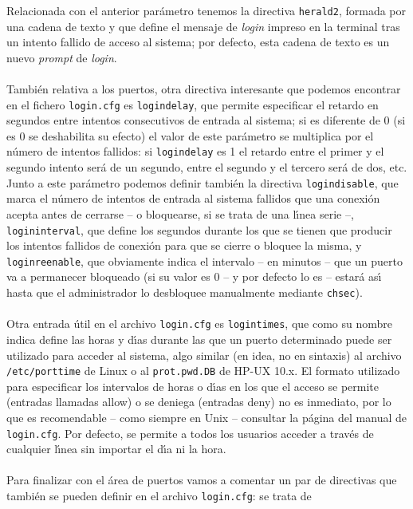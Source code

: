 Relacionada con el anterior par\'ametro tenemos la directiva {\tt herald2}, 
formada por una cadena de texto y que define el mensaje de {\it login} impreso
en la terminal tras un intento fallido de acceso al sistema; por defecto, esta
cadena de texto es un nuevo {\it prompt} de {\it login}.\\
\\Tambi\'en relativa a los puertos, otra directiva interesante que podemos 
encontrar en el fichero {\tt login.cfg}
es {\tt logindelay}, que permite especificar el retardo en segundos entre
intentos consecutivos de entrada al sistema; si es diferente de 0 (si es 0 se
deshabilita su efecto) el valor de este par\'ametro se multiplica por el 
n\'umero de intentos fallidos: si {\tt logindelay} es 1 el retardo entre el 
primer y el segundo intento ser\'a de un segundo, entre el segundo y el tercero
ser\'a de dos, etc. Junto a este par\'ametro podemos definir tambi\'en la
directiva {\tt logindisable}, que marca el n\'umero de intentos de entrada al
sistema fallidos que una conexi\'on acepta antes de cerrarse -- o bloquearse, si
se trata de una l\'{\i}nea serie --, {\tt logininterval}, que define los 
segundos durante los que se tienen que producir los intentos fallidos de 
conexi\'on para que se cierre o bloquee la misma, y {\tt loginreenable}, que
obviamente indica el intervalo -- en minutos -- que un puerto va a permanecer
bloqueado (si su valor es 0 -- y por defecto lo es -- estar\'a as\'{\i} hasta 
que el administrador lo desbloquee manualmente mediante {\tt chsec}).\\
\\Otra entrada \'util en el archivo {\tt login.cfg} es {\tt logintimes}, que
como su nombre indica define las horas y d\'{\i}as durante las que un puerto
determinado puede ser utilizado para acceder al sistema, algo similar (en idea, 
no en sintaxis) al archivo 
{\tt /etc/porttime} de Linux o al {\tt prot.pwd.DB} de HP-UX 10.x. El formato
utilizado para especificar los intervalos de horas o d\'{\i}as en los que el
acceso se permite (entradas llamadas {\sc allow}) o se deniega (entradas {\sc
deny}) no es inmediato, por lo que es recomendable -- como siempre en Unix -- 
consultar la p\'agina del manual de {\tt login.cfg}. Por defecto, se permite a
todos los usuarios acceder a trav\'es de cualquier l\'{\i}nea sin importar el
d\'{\i}a ni la hora.\\
\\Para finalizar con el \'area de puertos vamos a comentar un par de directivas
que tambi\'en se pueden definir en el archivo {\tt login.cfg}: se trata de
